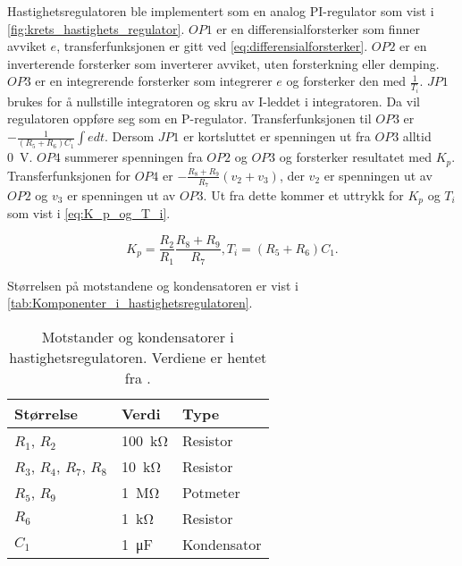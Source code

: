 Hastighetsregulatoren ble implementert som en analog PI-regulator som vist i \autoref{fig:krets_hastighets_regulator}. $OP1$ er en differensialforsterker som finner avviket $e$, transferfunksjonen er gitt ved \autoref{eq:differensialforsterker}.
$OP2$ er en inverterende forsterker som inverterer avviket, uten forsterkning eller demping.
$OP3$ er en integrerende forsterker som integrerer $e$ og forsterker den med $\frac{1}{T_i}$. $JP1$ brukes for å nullstille integratoren og skru av I-leddet i integratoren. Da vil regulatoren oppføre seg som en P-regulator. Transferfunksjonen til $OP3$ er $-\frac{1}{(R_5 + R_6) C_1} \int e dt$. Dersom $JP1$ er kortsluttet er spenningen ut fra $OP3$ alltid {\SI{0}{\volt}}.
$OP4$ summerer spenningen fra $OP2$ og $OP3$ og forsterker resultatet med $K_p$. Transferfunksjonen for $OP4$ er $-\frac{R_8 + R_9}{R_7}(v_2 + v_3)$, der $v_2$ er spenningen ut av $OP2$ og $v_3$ er spenningen ut av $OP3$. Ut fra dette kommer et uttrykk for $K_p$ og $T_i$ som vist i \autoref{eq:K_p_og_T_i}.

\begin{equation}
    \label{eq:K_p_og_T_i}
    K_p = \frac{R_2}{R_1} \frac{R_8 + R_9}{R_7}, 
    T_i = (R_5 + R_6) C_1.
\end{equation}

Størrelsen på motstandene og kondensatoren er vist i \autoref{tab:Komponenter_i_hastighetsregulatoren}.

\begin{table}[h]
    \centering
    \caption{Motstander og kondensatorer i hastighetsregulatoren. Verdiene er hentet fra \cite{AnalogMotorlabbOppgaver}.}
    \begin{tabular}{lll}
        \toprule
        Størrelse & Verdi & Type \\
		\midrule
        $R_1$, $R_2$ & \SI{100}{\kilo\ohm} & Resistor\\
        $R_3$, $R_4$, $R_7$, $R_8$ & \SI{10}{\kilo\ohm} & Resistor \\
        $R_5$, $R_9$ & \SI{1}{\mega\ohm} & Potmeter \\
        $R_6$ & \SI{1}{\kilo\ohm} & Resistor \\
        $C_1$ & \SI{1}{\micro\farad} & Kondensator \\
        \bottomrule
    \end{tabular}
    \label{tab:Komponenter_i_hastighetsregulatoren}
\end{table}






